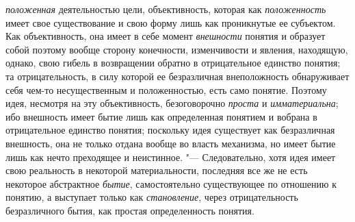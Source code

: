 {{{\em положенная}
деятельностью цели, объективность, которая как
{\em положенность} имеет
свое существование и свою форму лишь как проникнутые ее субъектом. Как
объективность, она имеет в себе момент
{\em внешности} понятия и
образует собой поэтому вообще сторону конечности, изменчивости и явления,
находящую, однако, свою гибель в возвращении обратно в отрицательное
единство понятия; та отрицательность, в силу которой ее безразличная
внеположность обнаруживает себя чем-то несущественным и положенностью, есть
само понятие. Поэтому идея, несмотря на эту объективность, безоговорочно
{\em проста} и
{\em имматериальна}; ибо
внешность имеет бытие лишь как определенная понятием и вобрана в
отрицательное единство понятия; поскольку идея существует как безразличная
внешность, она не только отдана вообще во власть механизма, но имеет бытие
лишь как нечто преходящее и неистинное. "--- Следовательно,
хотя идея имеет свою реальность в некоторой материальности, последняя все
же не есть некоторое абстрактное
{\em бытие},
самостоятельно существующее по отношению к понятию, а
выступает только как {\em становление},
через отрицательность безразличного бытия, как простая
определенность понятия.

}}
